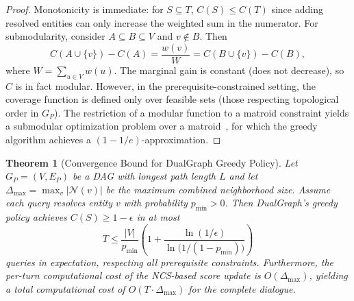\documentclass[11pt,a4paper]{article}
\newtheorem{theorem}{Theorem}
\begin{document}
\begin{proof}
Monotonicity is immediate: for $S \subseteq T$, $C(S) \leq C(T)$ since
adding resolved entities can only increase the weighted sum in the numerator.
For submodularity, consider $A \subseteq B \subseteq V$ and $v \notin B$. Then
\[
  C(A \cup \{v\}) - C(A) = \frac{w(v)}{W} = C(B \cup \{v\}) - C(B),
\]
where $W = \sum_{u \in V} w(u)$. The marginal gain is constant (does not
decrease), so $C$ is in fact modular. However, in the
prerequisite-constrained setting, the coverage function is defined only over
feasible sets (those respecting topological order in $G_P$). The restriction
of a modular function to a matroid constraint yields a submodular optimization
problem over a matroid~\cite{calinescu2011, vondrak2008}, for which the greedy
algorithm achieves a $(1 - 1/e)$-approximation.
\end{proof}

\begin{theorem}[Convergence Bound for DualGraph Greedy Policy]
\label{thm:convergence}
Let $G_P = (V, E_P)$ be a DAG with longest path length $L$ and let
$\Delta_{\max} = \max_v |\mathcal{N}(v)|$ be the maximum combined
neighborhood size. Assume each query resolves entity $v$ with probability
$p_{\min} > 0$. Then DualGraph's greedy policy achieves
$C(S) \geq 1 - \epsilon$ in at most
\[
  T \leq \frac{|V|}{p_{\min}} \left(1 +
    \frac{\ln(1/\epsilon)}{\ln\bigl(1/(1 - p_{\min})\bigr)}\right)
\]
queries in expectation, respecting all prerequisite constraints. Furthermore,
the per-turn computational cost of the NCS-based score update is
$O(\Delta_{\max})$, yielding a total computational cost of
$O(T \cdot \Delta_{\max})$ for the complete dialogue.
\end{theorem}
\end{document}
